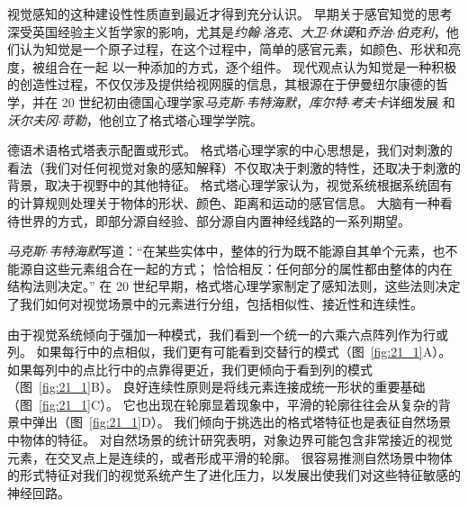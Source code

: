 视觉感知的这种建设性性质直到最近才得到充分认识。
早期关于感官知觉的思考深受英国经验主义哲学家的影响，尤其是\textit{约翰$\cdot$洛克}、\textit{大卫$\cdot$休谟}和\textit{乔治$\cdot$伯克利}，他们认为知觉是一个原子过程，在这个过程中，简单的感官元素，如颜色、形状和亮度，被组合在一起 以一种添加的方式，逐个组件。
现代观点认为知觉是一种积极的创造性过程，不仅仅涉及提供给视网膜的信息，其根源在于伊曼纽尔康德的哲学，并在 20 世纪初由德国心理学家\textit{马克斯$\cdot$韦特海默}，\textit{库尔特$\cdot$考夫卡}详细发展 和\textit{沃尔夫冈$\cdot$苛勒}，他创立了格式塔心理学学院。


德语术语格式塔表示配置或形式。
格式塔心理学家的中心思想是，我们对刺激的看法（我们对任何视觉对象的感知解释）不仅取决于刺激的特性，还取决于刺激的背景，取决于视野中的其他特征。
格式塔心理学家认为，视觉系统根据系统固有的计算规则处理关于物体的形状、颜色、距离和运动的感官信息。
大脑有一种看待世界的方式，即部分源自经验、部分源自内置神经线路的一系列期望。


\textit{马克斯$\cdot$韦特海默}写道：“在某些实体中，整体的行为既不能源自其单个元素，也不能源自这些元素组合在一起的方式；
恰恰相反：任何部分的属性都由整体的内在结构法则决定。” 
在 20 世纪早期，格式塔心理学家制定了感知法则，这些法则决定了我们如何对视觉场景中的元素进行分组，包括相似性、接近性和连续性。


由于视觉系统倾向于强加一种模式，我们看到一个统一的六乘六点阵列作为行或列。
如果每行中的点相似，我们更有可能看到交替行的模式（图~\ref{fig:21_1}A）。
如果每列中的点比行中的点靠得更近，我们更倾向于看到列的模式（图~\ref{fig:21_1}B）。
良好连续性原则是将线元素连接成统一形状的重要基础（图~\ref{fig:21_1}C）。
它也出现在轮廓显着现象中，平滑的轮廓往往会从复杂的背景中弹出（图~\ref{fig:21_1}D）。
我们倾向于挑选出的格式塔特征也是表征自然场景中物体的特征。
对自然场景的统计研究表明，对象边界可能包含非常接近的视觉元素，在交叉点上是连续的，或者形成平滑的轮廓。
很容易推测自然场景中物体的形式特征对我们的视觉系统产生了进化压力，以发展出使我们对这些特征敏感的神经回路。


